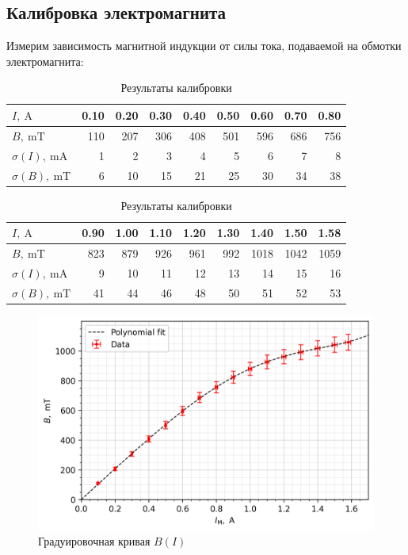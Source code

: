 \documentclass[12pt, a4paper]{article}
\begin{document}
\subsection{Калибровка электромагнита}
Измерим зависимость магнитной индукции от силы тока, подаваемой на обмотки электромагнита:
\begin{table}[H]

  \begin{tabular}{|l|r|r|r|r|r|r|r|r|}
    \hline
    $I,~\mathrm{A}$ & 0.10 & 0.20 & 0.30 & 0.40 & 0.50 & 0.60 & 0.70 & 0.80 \\ \hline
    $B,~\mathrm{mT}$ & 110 & 207 & 306 & 408 & 501 & 596 & 686 & 756 \\ \hline
    $\sigma (I),~\mathrm{mA}$ & 1 & 2 & 3 & 4 & 5 & 6 & 7 & 8 \\ \hline
    $\sigma(B),~\mathrm{mT}$ & 6 & 10 & 15 & 21 & 25 & 30 & 34 & 38\\ \hline
  \end{tabular}
  \begin{tabular}{|l|r|r|r|r|r|r|r|r|}
    \hline
    $I,~\mathrm{A}$  & 0.90 & 1.00 & 1.10 & 1.20 & 1.30 & 1.40 & 1.50 & 1.58 \\ \hline
    $B,~\mathrm{mT}$ & 823 & 879 & 926 & 961 & 992 & 1018 & 1042 & 1059 \\ \hline
    $\sigma(I),~\mathrm{mA}$ & 9 & 10 & 11 & 12 & 13 & 14 & 15 & 16 \\ \hline
    $\sigma (B),~\mathrm{mT}$  & 41 & 44 & 46 & 48 & 50 & 51 & 52 & 53 \\ \hline

  \end{tabular}
  \caption{Результаты калибровки}
  \label{Table:calibration}
\end{table}

\begin{figure}[H]
  \centering
  \includegraphics[width=0.6\linewidth]{pics/calibration.png}
  \caption{Градуировочная кривая $B(I)$}
  \label{fig:low_freq}
\end{figure}
\end{document}
